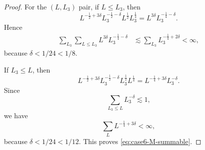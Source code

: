 \documentclass[12pt,oneside,reqno]{amsart}
\numberwithin{equation}{section}
\theoremstyle{plain}
\begin{document}
\begin{proof}
For the $(L,L_3)$ pair, if $L\leq L_3$, then
\begin{equation}
    L^{-\frac12+3\delta}
    L_3^{-\frac12-\delta}
    L^{\frac12}
    L_3^{\frac14}
    =
    L^{3\delta}
    L_3^{-\frac14-\delta}.
\end{equation}
Hence
\begin{align}
\sum_{L_3}
\sum_{L\leq L_3}
L^{3\delta}
L_3^{-\frac14-\delta}
&\lesssim
\sum_{L_3}
L_3^{-\frac14+2\delta}
<\infty,
\end{align}
because $\delta<1/24<1/8$.

If $L_3\leq L$, then
\begin{equation}
    L^{-\frac12+3\delta}
    L_3^{-\frac12-\delta}
    L_3^{\frac12}
    L^{\frac14}
    =
    L^{-\frac14+3\delta}
    L_3^{-\delta}.
\end{equation}
Since
\begin{equation}
    \sum_{L_3\leq L}
    L_3^{-\delta}
    \lesssim1,
\end{equation}
we have
\begin{equation}
    \sum_L
    L^{-\frac14+3\delta}
    <\infty,
\end{equation}
because $\delta<1/24<1/12$. This proves
\eqref{eq:case6-M-summable}.


\end{proof}
\end{document}
